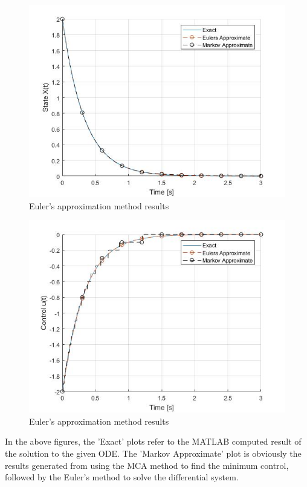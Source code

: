 \documentclass[11pt,draftd]{article}
\begin{document}
\begin{figure}[h!]
	\centering
	\label{eulersmethod1}
	\includegraphics[scale = 0.6]{EulersApproximateState}
	\caption{Euler's approximation method results}
\end{figure}
\begin{figure}[h!]
	\centering
	\label{eulersmethod2}
	\includegraphics[scale = 0.6]{EulersApproximateControl}
	\caption{Euler's approximation method results}
\end{figure}

In the above figures, the 'Exact' plots refer to the MATLAB computed result of the solution to the given ODE. The 'Markov Approximate' plot is obviously the results generated from using the MCA method to find the minimum control, followed by the Euler's method to solve the differential system.
\end{document}
